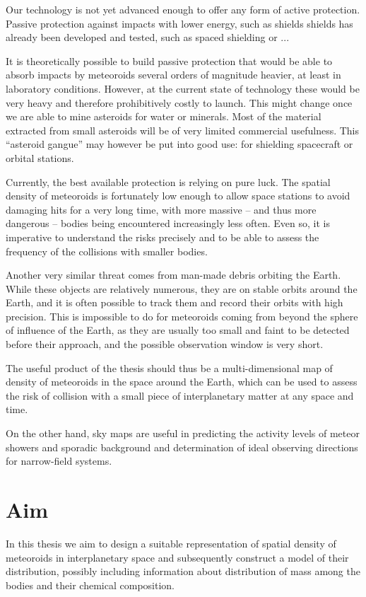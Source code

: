     Our technology is not yet advanced enough to offer any form of active protection.
    Passive protection against impacts with lower energy, such as shields shields has already been developed and tested,
    such as spaced shielding \cite{...} or ...

    It is theoretically possible to build passive protection that would be able to absorb impacts
    by meteoroids several orders of magnitude heavier, at least in laboratory conditions.
    However, at the current state of technology these would be very heavy and therefore prohibitively costly to launch.
    This might change once we are able to mine asteroids for water or minerals.
    Most of the material extracted from small asteroids will be of very limited commercial usefulness.
    This ``asteroid gangue'' may however be put into good use: for shielding spacecraft or orbital stations.

    Currently, the best available protection is relying on pure luck. The spatial density of meteoroids is
    fortunately low enough to allow space stations to avoid damaging hits for a very long time,
    with more massive -- and thus more dangerous -- bodies being encountered increasingly less often.
    Even so, it is imperative to understand the risks precisely and to be able to assess the frequency
    of the collisions with smaller bodies.

    Another very similar threat comes from man-made debris orbiting the Earth.
    While these objects are relatively numerous, they are on stable orbits around
    the Earth, and it is often possible to track them and record their orbits with high precision.
    This is impossible to do for meteoroids coming from beyond the sphere of influence of the Earth,
    as they are usually too small and faint to be detected before their approach, and the possible
    observation window is very short.

    The useful product of the thesis should thus be a multi-dimensional map of density
    of meteoroids in the space around the Earth, which can be used to assess the risk
    of collision with a small piece of interplanetary matter at any space and time.

    On the other hand, sky maps are useful in predicting the activity levels of
    meteor showers and sporadic background and determination of ideal observing
    directions for narrow-field systems.


\section{Aim}
    In this thesis we aim to design a suitable representation of spatial density of meteoroids
    in interplanetary space and subsequently construct a model of their distribution,
    possibly including information about distribution of mass among the bodies and their chemical composition.

